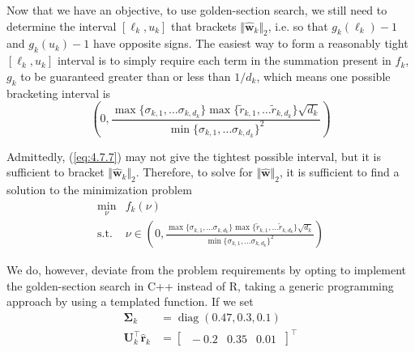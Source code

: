 \documentclass{article}
\numberwithin{equation}{section}
\begin{document}
Now that we have an objective, to use golden-section search, we still need to
determine the interval $ [\ell_k, u_k] $ that brackets
$ \Vert\hat{\mathbf{w}}_k\Vert_2 $, i.e. so that $ g_k(\ell_k) - 1 $ and
$ g_k(u_k) -1 $ have opposite signs. The easiest way to form a reasonably
tight $ [\ell_k, u_k] $ interval is to simply require each term in the
summation present in $ f_k $, $ g_k $ to be guaranteed greater than or less
than $ 1 / d_k $, which means one possible bracketing interval is
\begin{equation} \label{eq:4.7.7}
    \left(
        0,
        \frac{
            \max\{\sigma_{k, 1}, \ldots \sigma_{k, d_k}\}
            \max\{\tilde{r}_{k, 1}, \ldots \tilde{r}_{k, d_k}\}\sqrt{d_k}
        }{
            \min\{\sigma_{k, 1}, \ldots \sigma_{k, d_k}\}^2
        }
    \right)
\end{equation}

Admittedly, (\ref{eq:4.7.7}) may not give the tightest possible interval, but
it is sufficient to bracket $ \Vert\hat{\mathbf{w}}_k\Vert_2 $. Therefore, to
solve for $ \Vert\hat{\mathbf{w}}\Vert_2 $, it is sufficient to find a
solution to the minimization problem
\begin{equation} \label{eq:4.7.8}
    \begin{array}{ll}
        \displaystyle\min_\nu & f_k(\nu) \\
        \text{s.t.} &
        \nu \in
        \left(
            0,
            \frac{
                \max\{\sigma_{k, 1}, \ldots \sigma_{k, d_k}\}
                \max\{\tilde{r}_{k, 1}, \ldots \tilde{r}_{k, d_k}\}\sqrt{d_k}
            }{
                \min\{\sigma_{k, 1}, \ldots \sigma_{k, d_k}\}^2
            }
        \right)
    \end{array}
\end{equation}

We do, however, deviate from the problem requirements by opting to implement
the golden-section search in C++ instead of R, taking a generic programming
approach by using a templated function. If we set
\begin{equation*}
    \begin{split}
        \mathbf{\Sigma}_k & = \operatorname{diag}(0.47, 0.3, 0.1) \\
        \mathbf{U}_k^\top\hat{\mathbf{r}}_k & = \begin{bmatrix}
            \ -0.2 & 0.35 & 0.01 \
        \end{bmatrix}^\top
    \end{split}
\end{equation*}
\end{document}
